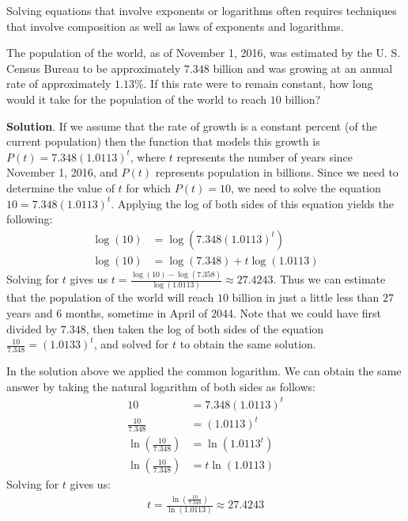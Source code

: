 \documentclass[10pt,]{book}
\theoremstyle{ptxdefinitionnotitle}
\theoremstyle{ptxdefinitiontitle}
\theoremstyle{ptxdefinitionnotitle}
\theoremstyle{ptxdefinitiontitle}
\theoremstyle{ptxdefinitionnotitle}
\theoremstyle{ptxdefinitiontitle}
\numberwithin{equation}{section}
\newcommand{\amp}{&}
\begin{document}
\hypertarget{p-372}{}%
Solving equations that involve exponents or logarithms often requires techniques that involve composition as well as laws of exponents and logarithms.%
\begin{example}\label{example-30}
\hypertarget{p-373}{}%
The population of the world, as of November 1, 2016, was estimated by the U. S. Census Bureau to be approximately \(7.348\) billion and was growing at an annual rate of approximately \(1.13\%\). If this rate were to remain constant, how long would it take for the population of the world to reach \(10\) billion?%
\par\smallskip%
\noindent\textbf{Solution}.\hypertarget{solution-30}{}\quad%
\hypertarget{p-374}{}%
If we assume that the rate of growth is a constant percent (of the current population) then the function that models this growth is \(P(t)=7.348 \left( 1.0113 \right)^t\), where \(t\) represents the number of years since November 1, 2016, and \(P(t)\) represents population in billions.  Since we need to determine the value of \(t\) for which \(P(t) = 10\), we need to solve the equation \(10 = 7.348 \left( 1.0113 \right)^t\). Applying the log of both sides of this equation yields the following:%
\begin{align*}
\log \left( 10 \right) \amp = \log \left( 7.348 (1.0113)^t \right)\\
\log \left( 10 \right) \amp = \log \left( 7.348 \right) + t \log \left( 1.0113 \right)
\end{align*}
Solving for \(t\) gives us \(t = \frac{\log \left( 10 \right) - \log \left( 7.358 \right)}{\log \left( 1.0113 \right)} \approx 27.4243\). Thus we can estimate that the population of the world will reach \(10\) billion in just a little less than \(27\) years and \(6\) months, sometime in April of 2044. Note that we could have first divided by \(7.348\), then taken the log of both sides of the equation \(\frac{10}{7.348} = \left( 1.0133 \right) ^t\), and solved for \(t\) to obtain the same solution.%
\par
\hypertarget{p-375}{}%
In the solution above we applied the common logarithm. We can obtain the same answer by taking the natural logarithm of both sides as follows:%
\begin{align*}
10 \amp = 7.348 \left( 1.0113 \right) ^t\\
\frac{10}{7.348} \amp = \left( 1.0113 \right) ^t\\
\ln \left( \frac{10}{7.348} \right) \amp = \ln \left( 1.0113^t \right)\\
\ln \left( \frac{10}{7.348} \right) \amp = t \ln \left( 1.0113 \right)
\end{align*}
Solving for \(t\) gives us:%
\begin{gather*}
t = \frac{\ln \left( \frac{10}{7.348} \right)}{\ln \left( 1.0113 \right)} \approx 27.4243
\end{gather*}
%
\end{example}
\end{document}
